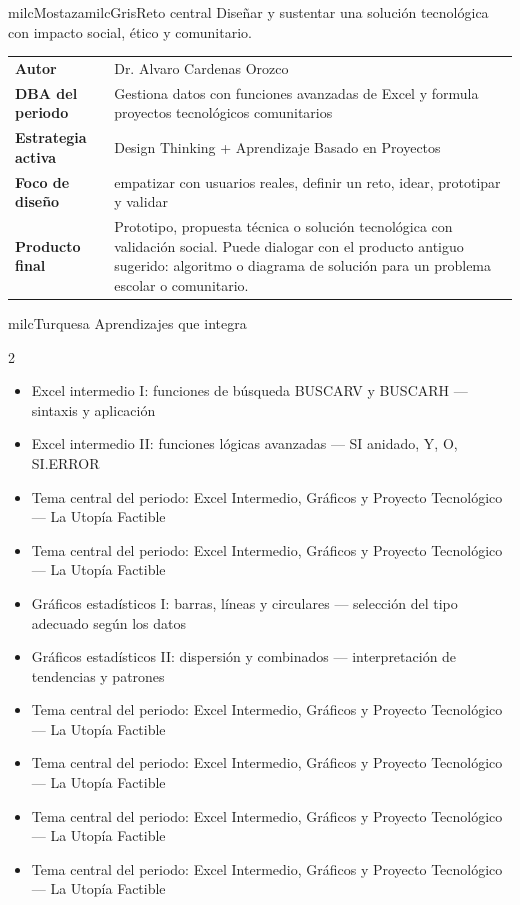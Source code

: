 \documentclass[11pt,letterpaper]{article}
\begin{document}
\begin{softbox}{milcMostaza}{milcGris}{Reto central}
Diseñar y sustentar una solución tecnológica con impacto social, ético y comunitario.
\end{softbox}

\begin{tabularx}{\textwidth}{>{\bfseries}p{3.4cm}X}
\rowcolor{milcMagenta!12}Autor & Dr. Alvaro Cardenas Orozco\\
DBA del periodo & Gestiona datos con funciones avanzadas de Excel y formula proyectos tecnológicos comunitarios\\
Estrategia activa & Design Thinking + Aprendizaje Basado en Proyectos\\
Foco de diseño & empatizar con usuarios reales, definir un reto, idear, prototipar y validar\\
Producto final & Prototipo, propuesta técnica o solución tecnológica con validación social. Puede dialogar con el producto antiguo sugerido: algoritmo o diagrama de solución para un problema escolar o comunitario.\\
\end{tabularx}

\begin{titlebox}{milcTurquesa}
Aprendizajes que integra
\end{titlebox}
\begin{multicols}{2}
\begin{itemize}[leftmargin=*]
\item Excel intermedio I: funciones de búsqueda BUSCARV y BUSCARH — sintaxis y aplicación
\item Excel intermedio II: funciones lógicas avanzadas — SI anidado, Y, O, SI.ERROR
\item Tema central del periodo: Excel Intermedio, Gráficos y Proyecto Tecnológico — La Utopía Factible
\item Tema central del periodo: Excel Intermedio, Gráficos y Proyecto Tecnológico — La Utopía Factible
\item Gráficos estadísticos I: barras, líneas y circulares — selección del tipo adecuado según los datos
\item Gráficos estadísticos II: dispersión y combinados — interpretación de tendencias y patrones
\item Tema central del periodo: Excel Intermedio, Gráficos y Proyecto Tecnológico — La Utopía Factible
\item Tema central del periodo: Excel Intermedio, Gráficos y Proyecto Tecnológico — La Utopía Factible
\item Tema central del periodo: Excel Intermedio, Gráficos y Proyecto Tecnológico — La Utopía Factible
\item Tema central del periodo: Excel Intermedio, Gráficos y Proyecto Tecnológico — La Utopía Factible
\end{itemize}
\end{multicols}
\end{document}
